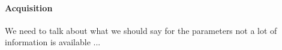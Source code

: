 \documentclass[authoryear]{elsarticle}
\begin{document}
\paragraph{Acquisition} %

We need to talk about what we should say for the parameters not a lot of information is available ...
\end{document}
